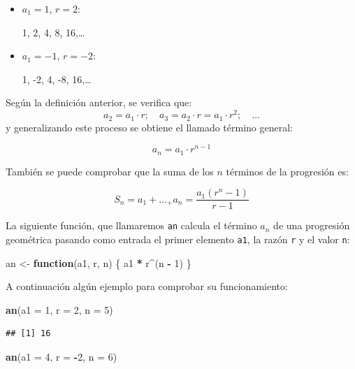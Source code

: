 \documentclass[]{book}
\newenvironment{Shaded}{\begin{snugshade}}{\end{snugshade}}
\newcommand{\KeywordTok}[1]{\textcolor[rgb]{0.13,0.29,0.53}{\textbf{#1}}}
\newcommand{\DataTypeTok}[1]{\textcolor[rgb]{0.13,0.29,0.53}{#1}}
\newcommand{\DecValTok}[1]{\textcolor[rgb]{0.00,0.00,0.81}{#1}}
\newcommand{\StringTok}[1]{\textcolor[rgb]{0.31,0.60,0.02}{#1}}
\newcommand{\ControlFlowTok}[1]{\textcolor[rgb]{0.13,0.29,0.53}{\textbf{#1}}}
\newcommand{\OperatorTok}[1]{\textcolor[rgb]{0.81,0.36,0.00}{\textbf{#1}}}
\newcommand{\NormalTok}[1]{#1}
\begin{document}
\begin{itemize}
\item
  \(a_1=1\), \(r=2\):

  1, 2, 4, 8, 16,\ldots{}
\item
  \(a_1=-1\), \(r=-2\):

  1, -2, 4, -8, 16,\ldots{}
\end{itemize}

Según la definición anterior, se verifica que:
\[a_2=a_1\cdot r; \quad a_3=a_2\cdot r=a_1\cdot r^2; \quad ...\] y
generalizando este proceso se obtiene el llamado término general:

\[a_n=a_1\cdot r^{n-1}\]

También se puede comprobar que la suma de los \(n\) términos de la
progresión es:

\[S_n=a_1+\ldots_+a_n=\frac{a_1(r^n-1)}{r-1}\]

La siguiente función, que llamaremos \texttt{an} calcula el término
\(a_n\) de una progresión geométrica pasando como entrada el primer
elemento \texttt{a1}, la razón \texttt{r} y el valor \texttt{n}:

\begin{Shaded}
\begin{Highlighting}[]
\NormalTok{an <-}\StringTok{ }\ControlFlowTok{function}\NormalTok{(a1, r, n) \{}
\NormalTok{        a1 }\OperatorTok{*}\StringTok{ }\NormalTok{r}\OperatorTok{^}\NormalTok{(n }\OperatorTok{-}\StringTok{ }\DecValTok{1}\NormalTok{)}
\NormalTok{      \}}
\end{Highlighting}
\end{Shaded}

A continuación algún ejemplo para comprobar su funcionamiento:

\begin{Shaded}
\begin{Highlighting}[]
\KeywordTok{an}\NormalTok{(}\DataTypeTok{a1 =} \DecValTok{1}\NormalTok{, }\DataTypeTok{r =} \DecValTok{2}\NormalTok{, }\DataTypeTok{n =} \DecValTok{5}\NormalTok{)}
\end{Highlighting}
\end{Shaded}

\begin{verbatim}
## [1] 16
\end{verbatim}

\begin{Shaded}
\begin{Highlighting}[]
\KeywordTok{an}\NormalTok{(}\DataTypeTok{a1 =} \DecValTok{4}\NormalTok{, }\DataTypeTok{r =} \OperatorTok{-}\DecValTok{2}\NormalTok{, }\DataTypeTok{n =} \DecValTok{6}\NormalTok{)}
\end{Highlighting}
\end{Shaded}
\end{document}

